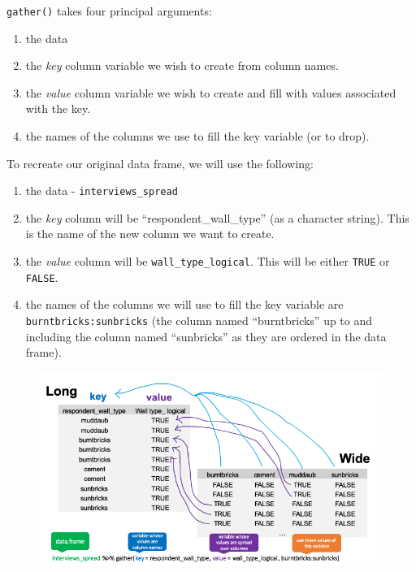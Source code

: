 \documentclass[]{book}
\newenvironment{Shaded}{\begin{snugshade}}{\end{snugshade}}
\newcommand{\KeywordTok}[1]{\textcolor[rgb]{0.13,0.29,0.53}{\textbf{#1}}}
\newcommand{\DataTypeTok}[1]{\textcolor[rgb]{0.13,0.29,0.53}{#1}}
\newcommand{\StringTok}[1]{\textcolor[rgb]{0.31,0.60,0.02}{#1}}
\newcommand{\OperatorTok}[1]{\textcolor[rgb]{0.81,0.36,0.00}{\textbf{#1}}}
\newcommand{\NormalTok}[1]{#1}
\providecommand{\tightlist}{%
  \setlength{\itemsep}{0pt}\setlength{\parskip}{0pt}}
\begin{document}
\texttt{gather()} takes four principal arguments:

\begin{enumerate}
\def\labelenumi{\arabic{enumi}.}
\tightlist
\item
  the data
\item
  the \emph{key} column variable we wish to create from column names.
\item
  the \emph{value} column variable we wish to create and fill with
  values associated with the key.
\item
  the names of the columns we use to fill the key variable (or to drop).
\end{enumerate}

To recreate our original data frame, we will use the following:

\begin{enumerate}
\def\labelenumi{\arabic{enumi}.}
\tightlist
\item
  the data - \texttt{interviews\_spread}
\item
  the \emph{key} column will be ``respondent\_wall\_type'' (as a
  character string). This is the name of the new column we want to
  create.
\item
  the \emph{value} column will be \texttt{wall\_type\_logical}. This
  will be either \texttt{TRUE} or \texttt{FALSE}.
\item
  the names of the columns we will use to fill the key variable are
  \texttt{burntbricks:sunbricks} (the column named ``burntbricks'' up to
  and including the column named ``sunbricks'' as they are ordered in
  the data frame).
\end{enumerate}

\begin{Shaded}
\end{Shaded}

\begin{figure}
\centering
\includegraphics{./fig/wide_to_long.png}
\caption{}
\end{figure}
\end{document}
